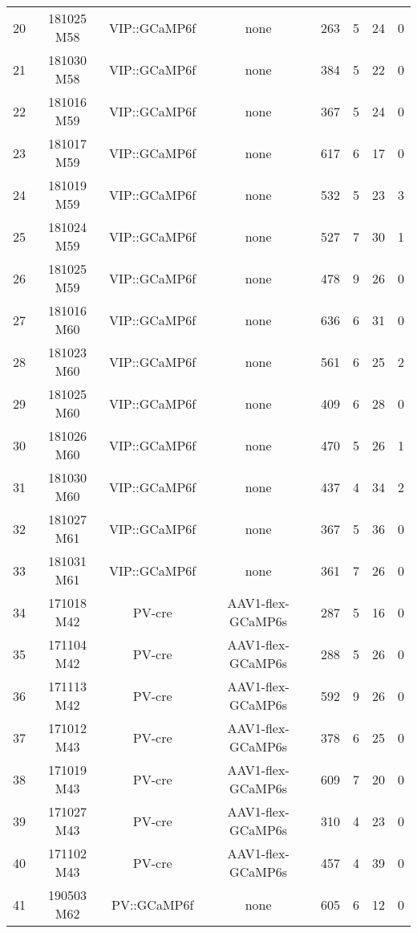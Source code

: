 \begin{table}[htbp]
\begin{tabular}{lccccccc}
    20    & 181025 M58 & VIP::GCaMP6f & none  & 263   & 5     & 24    & 0 \\
    21    & 181030 M58 & VIP::GCaMP6f & none  & 384   & 5     & 22    & 0 \\
    22    & 181016 M59 & VIP::GCaMP6f & none  & 367   & 5     & 24    & 0 \\
    23    & 181017 M59 & VIP::GCaMP6f & none  & 617   & 6     & 17    & 0 \\
    24    & 181019 M59 & VIP::GCaMP6f & none  & 532   & 5     & 23    & 3 \\
    25    & 181024 M59 & VIP::GCaMP6f & none  & 527   & 7     & 30    & 1 \\
    26    & 181025 M59 & VIP::GCaMP6f & none  & 478   & 9     & 26    & 0 \\
    27    & 181016 M60 & VIP::GCaMP6f & none  & 636   & 6     & 31    & 0 \\
    28    & 181023 M60 & VIP::GCaMP6f & none  & 561   & 6     & 25    & 2 \\
    29    & 181025 M60 & VIP::GCaMP6f & none  & 409   & 6     & 28    & 0 \\
    30    & 181026 M60 & VIP::GCaMP6f & none  & 470   & 5     & 26    & 1 \\
    31    & 181030 M60 & VIP::GCaMP6f & none  & 437   & 4     & 34    & 2 \\
    32    & 181027 M61 & VIP::GCaMP6f & none  & 367   & 5     & 36    & 0 \\
    33    & 181031 M61 & VIP::GCaMP6f & none  & 361   & 7     & 26    & 0 \\
    34    & 171018 M42 & PV-cre & AAV1-flex-GCaMP6s & 287   & 5     & 16    & 0 \\
    35    & 171104 M42 & PV-cre & AAV1-flex-GCaMP6s & 288   & 5     & 26    & 0 \\
    36    & 171113 M42 & PV-cre & AAV1-flex-GCaMP6s & 592   & 9     & 26    & 0 \\
    37    & 171012 M43 & PV-cre & AAV1-flex-GCaMP6s & 378   & 6     & 25    & 0 \\
    38    & 171019 M43 & PV-cre & AAV1-flex-GCaMP6s & 609   & 7     & 20    & 0 \\
    39    & 171027 M43 & PV-cre & AAV1-flex-GCaMP6s & 310   & 4     & 23    & 0 \\
    40    & 171102 M43 & PV-cre & AAV1-flex-GCaMP6s & 457   & 4     & 39    & 0 \\
    41    & 190503 M62 & PV::GCaMP6f & none  & 605   & 6     & 12    & 0 \\

\end{tabular}
\end{table}
